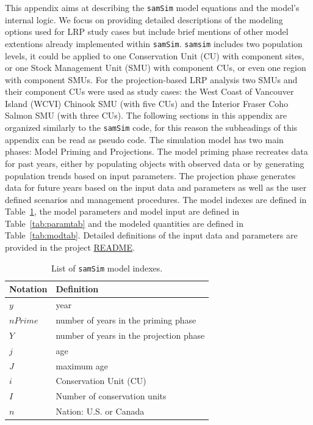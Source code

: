 \documentclass[11pt]{book}
\begin{document}
This appendix aims at describing the \texttt{samSim} model equations and the model's internal logic. We focus on providing detailed descriptions of the modeling options used for LRP study cases but include brief mentions of other model extentions already implemented within \texttt{samSim}. \texttt{samsim} includes two population levels, it could be applied to one Conservation Unit (CU) with component sites, or one Stock Management Unit (SMU) with component CUs, or even one region with component SMUs. For the projection-based LRP analysis two SMUs and their component CUs were used as study cases: the West Coast of Vancouver Island (WCVI) Chinook SMU (with five CUs) and the Interior Fraser Coho Salmon SMU (with three CUs). The following sections in this appendix are organized similarly to the \texttt{samSim} code, for this reason the subheadings of this appendix can be read as pseudo code. The simulation model has two main phases: Model Priming and Projections. The model priming phase recreates data for past years, either by populating objects with observed data or by generating population trends based on input parameters. The projection phase generates data for future years based on the input data and parameters as well as the user defined scenarios and management procedures. The model indexes are defined in Table~\ref{tab:indtab}, the model parameters and model input are defined in Table~\ref{tab:paramtab} and the modeled quantities are defined in Table~\ref{tab:modtab}. Detailed definitions of the input data and parameters are provided in the project \href{https://github.com/Pacific-salmon-assess/samSim/tree/LRP\#readme}{README}.
\begin{table}[ht]
\centering
\caption{List of \texttt{samSim} model indexes.}
\begin{tabular}{l l}
\hline
Notation & Definition \\ 
\hline
$y$ & year \\ 
$nPrime$ & number of years in the priming phase\\
$Y$ & number of years in the projection phase\\
$j$ & age \\
$J$ & maximum age \\
$i$ & Conservation Unit (CU)\\
$I$ & Number of conservation units\\
$n$ & Nation: U.S. or Canada \\
\hline
\end{tabular}
\label{tab:indtab}
\end{table}
\end{document}
